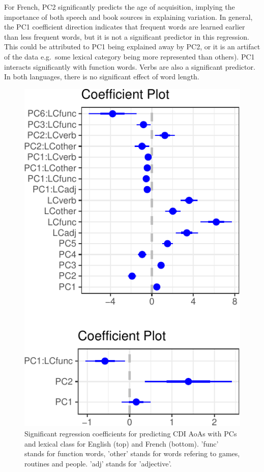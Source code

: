 \documentclass[10pt, letterpaper]{article}
\newenvironment{CodeChunk}{}{}
\begin{document}
For French, PC2 significantly predicts the age of acquisition, implying
the importance of both speech and book sources in explaining variation.
In general, the PC1 coefficient direction indicates that frequent words
are learned earlier than less frequent words, but it is not a
significant predictor in this regression. This could be attributed to
PC1 being explained away by PC2, or it is an artifact of the data
e.g.~some lexical category being more represented than others). PC1
interacts significantly with function words. Verbs are also a
significant predictor. In both languages, there is no significant effect
of word length.

\begin{CodeChunk}
\begin{figure}[H]

{\centering \includegraphics{figs/unnamed-chunk-8-1} 

}

\caption[Significant regression coefficients for predicting CDI AoAs with PCs and lexical class for English (top) and French (bottom)]{Significant regression coefficients for predicting CDI AoAs with PCs and lexical class for English (top) and French (bottom). 'func' stands for function words, 'other' stands for words refering to games, routines and people. 'adj' stands for 'adjective'. }\label{fig:unnamed-chunk-8}
\end{figure}
\end{CodeChunk}
\end{document}
